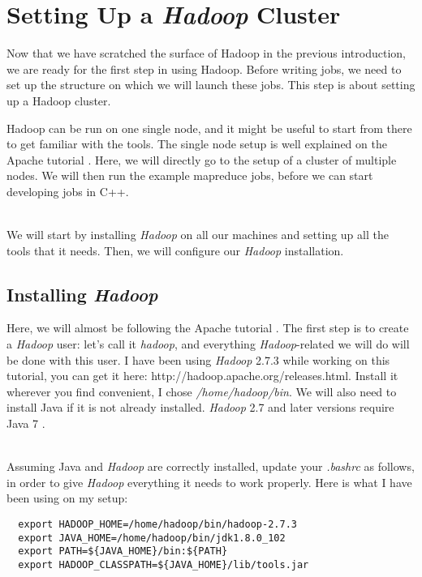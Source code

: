 \documentclass[a4paper, 12pt]{article}
\begin{document}
\section{Setting Up a \textit{Hadoop} Cluster}

Now that we have scratched the surface of Hadoop in the previous introduction, we are ready for the first step in using Hadoop. Before writing jobs, we need to set up the structure on which we will launch these jobs. This step is about setting up a Hadoop cluster.

Hadoop can be run on one single node, and it might be useful to start from there to get familiar with the tools. The single node setup is well explained on the Apache tutorial \cite{hadoop_single_node_setup}. Here, we will directly go to the setup of a cluster of multiple nodes. We will then run the example mapreduce jobs, before we can start developing jobs in C++.

~\\
We will start by installing \textit{Hadoop} on all our machines and setting up all the tools that it needs. Then, we will configure our \textit{Hadoop} installation.

  \subsection{Installing \textit{Hadoop}}
  
Here, we will almost be following the Apache tutorial \cite{hadoop_single_node_setup}. The first step is to create a \textit{Hadoop} user: let's call it \textit{hadoop}, and everything \textit{Hadoop}-related we will do will be done with this user. I have been using \textit{Hadoop} 2.7.3 while working on this tutorial, you can get it here: http://hadoop.apache.org/releases.html. Install it wherever you find convenient, I chose \textit{/home/hadoop/bin}. We will also need to install Java if it is not already installed. \textit{Hadoop} 2.7 and later versions require Java 7 \cite{hadoop_java_versions}.

~\\
Assuming Java and \textit{Hadoop} are correctly installed, update your \textit{.bashrc} as follows, in order to give \textit{Hadoop} everything it needs to work properly. Here is what I have been using on my setup:

\begin{verbatim}
  export HADOOP_HOME=/home/hadoop/bin/hadoop-2.7.3
  export JAVA_HOME=/home/hadoop/bin/jdk1.8.0_102
  export PATH=${JAVA_HOME}/bin:${PATH}
  export HADOOP_CLASSPATH=${JAVA_HOME}/lib/tools.jar
\end{verbatim}
\end{document}
